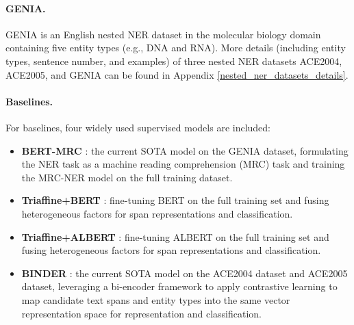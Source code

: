 \documentclass{article}
\begin{document}
\paragraph{GENIA.}
GENIA \citep{ohta2002genia} is an English nested NER dataset in the molecular biology domain containing five entity types (e.g., DNA and RNA).
More details (including entity types, sentence number, and examples) of three nested NER datasets ACE2004, ACE2005, and GENIA can be found in Appendix \ref{nested_ner_datasets_details}.

\paragraph{Baselines.} For baselines, four widely used supervised models are included:
\begin{itemize}
	\item \textbf{BERT-MRC} \citep{li2019unified}: the current SOTA model on the GENIA dataset, formulating the NER task as a machine reading comprehension (MRC) task and training the MRC-NER model on the full training dataset.
	\item \textbf{Triaffine+BERT} \citep{yuan2021fusing}: fine-tuning BERT \cite{devlin2018bert} on the full training set and fusing heterogeneous factors for span representations and classification.
	\item \textbf{Triaffine+ALBERT} \citep{yuan2021fusing}: fine-tuning ALBERT \cite{lan2019albert} on the full training set and fusing heterogeneous factors for span representations and classification.
	\item \textbf{BINDER} \citep{zhang2022optimizing}: the current SOTA model on the ACE2004 dataset and ACE2005 dataset, leveraging a bi-encoder framework to apply contrastive learning to map candidate text spans and entity types into the same vector representation space for representation and classification.
\end{itemize}
\end{document}
